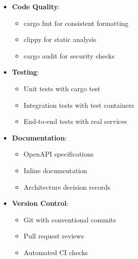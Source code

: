 \begin{itemize}
    \item \textbf{Code Quality}:
    \begin{itemize}
        \item cargo fmt for consistent formatting
        \item clippy for static analysis
        \item cargo audit for security checks
    \end{itemize}
    \item \textbf{Testing}:
    \begin{itemize}
        \item Unit tests with cargo test
        \item Integration tests with test containers
        \item End-to-end tests with real services
    \end{itemize}
    \item \textbf{Documentation}:
    \begin{itemize}
        \item OpenAPI specifications
        \item Inline documentation
        \item Architecture decision records
    \end{itemize}
    \item \textbf{Version Control}:
    \begin{itemize}
        \item Git with conventional commits
        \item Pull request reviews
        \item Automated CI checks
    \end{itemize}
\end{itemize}
